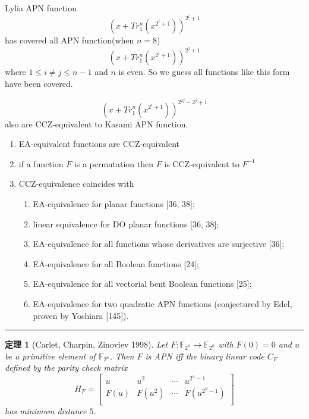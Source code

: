 \documentclass[12pt,a4paper]{ctexbook}
\newcommand{\0}{\textbf{0}}
\newcommand{\1}{\textbf{1}}
\newcommand{\F}{\mathbb{F}}
\newtheorem{theorem}{定理}
\begin{document}
    Lylia APN function\cite{Budaghyan2005}
    \[\left(x+Tr^n_1\left(x^{2^i+1}\right)\right)^{2^i+1}\]
    has covered all APN function(when $ n=8 $)
    \[\left(x+Tr^n_1\left(x^{2^i+1}\right)\right)^{2^j+1}\]
    where $ 1\leq i\neq j\leq n-1 $ and $ n $ is even.
    So we guess all functions like this form have been covered.
    
    
    \[\left(x+Tr^n_1\left(x^{2^i+1}\right)\right)^{2^{2j}-2^j+1}\]
    also are CCZ-equivalent to Kasami APN function.

    
    \begin{enumerate}
        \item EA-equivalent functions are CCZ-equivalent
        \item if a function $F$ is a permutation then $F$ is CCZ-equivalent to $F^{−1}$\cite{carlet1998codes}
        \item CCZ-equivalence coincides with\begin{enumerate}
            \item EA-equivalence for planar functions [36, 38];
            \item linear equivalence for DO planar functions [36, 38];
            \item EA-equivalence for all functions whose derivatives are surjective [36];
            \item EA-equivalence for all Boolean functions [24];
            \item EA-equivalence for all vectorial bent Boolean functions [25];
            \item EA-equivalence for two quadratic APN functions (conjectured by Edel,
            proven by Yoshiara [145]).
        \end{enumerate}
    \end{enumerate}
    \noindent\rule{\linewidth}{0.4pt}

    \begin{theorem}[Carlet, Charpin, Zinoviev 1998]
        Let $ F:\F_{2^n}\rightarrow\F_{2^n} $ with $ F(0)=0 $ and $ u $ be a primitive element of 
        $ \F_{2^n} $. Then $ F $ is APN iff the binary linear code $ C_F $ defined by the 
        parity check matrix
        \[H_F=\begin{bmatrix}
            u&u^2&\cdots&u^{2^n-1}\\
            F(u)&F(u^2)&\cdots&F(u^{2^n-1})\\
        \end{bmatrix}\]
        has minimum distance $ 5 $.
    \end{theorem}
\end{document}
